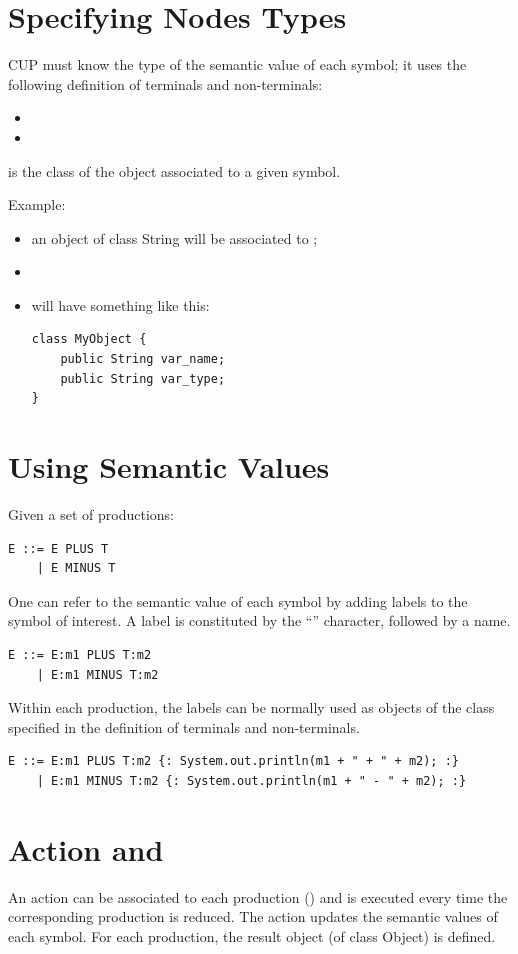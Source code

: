 \section{Specifying Nodes Types}
CUP must know the type of the semantic value of each symbol; it uses the following definition of terminals and non-terminals:
\begin{itemize}
    \item
    \item
\end{itemize}
 is the class of the object associated to a given symbol.

Example:
\begin{itemize}
    \item
     an object of class String will be associated to ;
    \item
    \item
     will have something like this:
    \begin{lstlisting}
class MyObject {
    public String var_name;
    public String var_type;
}
    \end{lstlisting}
\end{itemize}

\section{Using Semantic Values}
Given a set of productions:
\begin{lstlisting}
E ::= E PLUS T
    | E MINUS T
\end{lstlisting}
One can refer to the semantic value of each symbol by adding labels to the symbol of interest.
A label is constituted by the ``\code{:}'' character, followed by a name.
\begin{lstlisting}
E ::= E:m1 PLUS T:m2
    | E:m1 MINUS T:m2
\end{lstlisting}
Within each production, the labels can be normally used as objects of the class specified in the definition of terminals and non-terminals.
\begin{lstlisting}
E ::= E:m1 PLUS T:m2 {: System.out.println(m1 + " + " + m2); :}
    | E:m1 MINUS T:m2 {: System.out.println(m1 + " - " + m2); :}
\end{lstlisting}

\section{Action and }
An action can be associated to each production () and is executed every time the corresponding production is reduced.
The action updates the semantic values of each symbol.
For each production, the result object (of class Object) is defined.


